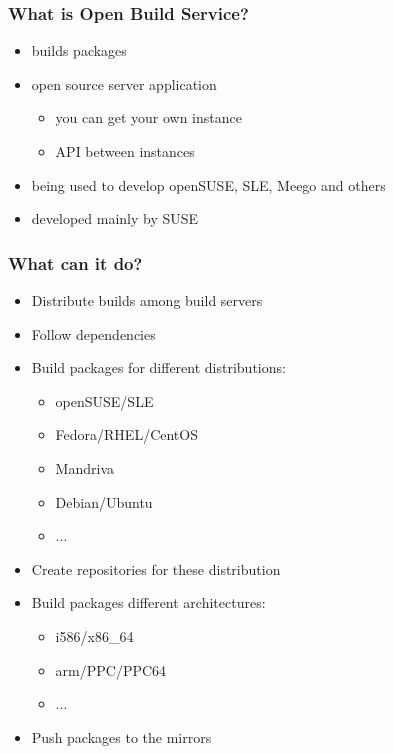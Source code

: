 \begin{frame}[t]
   \frametitle{What is Open Build Service?}
   \begin{itemize}
      \item builds packages
      \item open source server application
      \begin{itemize}
         \item you can get your own instance
         \item API between instances
      \end{itemize}
      \item being used to develop openSUSE, SLE, Meego and others
      \item developed mainly by SUSE
   \end{itemize}
\end{frame}

\begin{frame}[t]
   \frametitle{What can it do?}
   \begin{itemize}
      \item Distribute builds among build servers
      \item Follow dependencies
      \item Build packages for different distributions:
      \begin{itemize}
         \item openSUSE/SLE
         \item Fedora/RHEL/CentOS
         \item Mandriva
         \item Debian/Ubuntu
         \item ...
      \end{itemize}
      \item Create repositories for these distribution
      \item Build packages different architectures:
      \begin{itemize}
         \item i586/x86\_64
         \item arm/PPC/PPC64
         \item ...
      \end{itemize}
      \item Push packages to the mirrors
   \end{itemize}
\end{frame}

